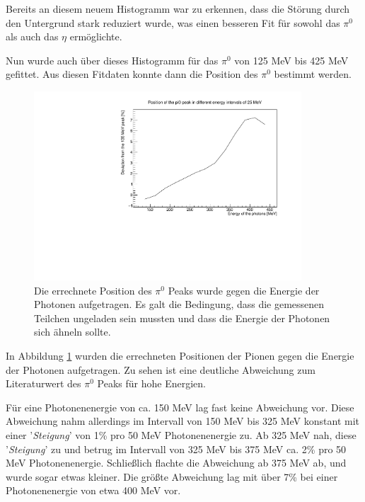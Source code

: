 \documentclass[a4paper,11pt,oneside,final,german,openbib,pdftex]{scrbook}
\begin{document}
{ Bereits an diesem neuem Histogramm war zu erkennen, dass die St\"orung durch den Untergrund stark reduziert wurde, was einen besseren Fit f\"ur sowohl das $\pi^0$ als auch das $\eta$ erm\"oglichte.
 
 Nun wurde auch \"uber dieses Histogramm f\"ur das $\pi^0$ von 125 MeV bis 425 MeV gefittet.
 Aus diesen Fitdaten konnte dann die Position des $\pi^0$ bestimmt werden. 
 
 \begin{figure}[h!]
 	\begin{center}
 		\includegraphics[width=100mm]{20172803SymmetricUnchargedDeviation}
 	
 		\caption{Die errechnete Position des $\pi^0$ Peaks wurde gegen die Energie der Photonen aufgetragen.
 			Es galt die Bedingung, dass die gemessenen Teilchen ungeladen sein mussten und dass die Energie der Photonen sich \"ahneln sollte.
 		} 
 		\label{fig.Energydependency_pion}
 	\end{center}
 \end{figure}

In Abbildung \ref{fig.Energydependency_pion} wurden die errechneten Positionen der Pionen gegen die Energie der Photonen aufgetragen. Zu sehen ist eine deutliche Abweichung zum Literaturwert des $\pi^0$ Peaks für hohe Energien. 

Für eine Photonenenergie von ca. 150 MeV lag fast keine Abweichung vor. Diese Abweichung nahm allerdings im Intervall von 150 MeV bis 325 MeV konstant mit einer '\textit{Steigung}' von 1\% pro 50 MeV Photonenenergie zu. Ab 325 MeV nah, diese '\textit{Steigung}' zu und betrug im Intervall von 325 MeV bis 375 MeV ca. 2\% pro 50 MeV Photonenenergie. Schließlich flachte die Abweichung ab 375 MeV ab, und wurde sogar etwas kleiner. Die größte Abweichung lag mit über 7\% bei einer Photonenenergie von etwa 400 MeV vor.

}
\end{document}
